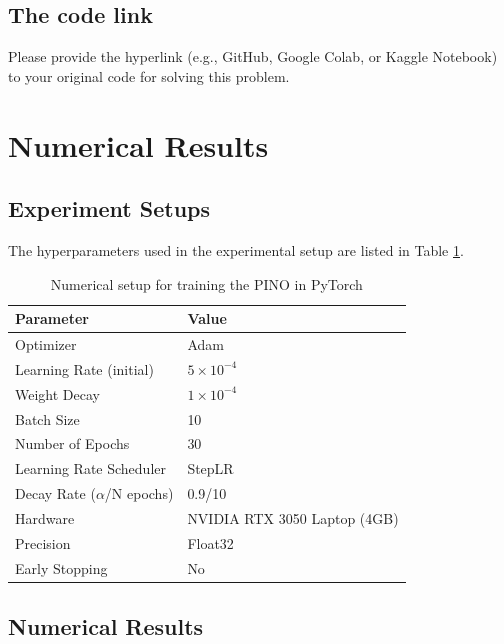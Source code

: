 \subsection{The code link}
{\color{blue}Please provide the hyperlink (e.g., GitHub, Google Colab, or Kaggle Notebook) to your original code for solving this problem.} 
%
\section{Numerical Results}
%
\subsection{Experiment Setups}
%

The hyperparameters used in the experimental setup are listed in Table \ref{tab:training_setup_D}. 


\begin{table}[H]
	\centering
	\caption{Numerical setup for training the PINO in PyTorch}
	\label{tab:training_setup_D}
	\begin{tabular}{ll}
		\hline
		\textbf{Parameter} & \textbf{Value} \\
		\hline
		Optimizer           & Adam \\
		Learning Rate (initial)       & $5 \times 10^{-4}$ \\
		Weight Decay       & $1 \times 10^{-4}$ \\
		Batch Size          & 10 \\
		Number of Epochs    & 30 \\
		Learning Rate Scheduler & StepLR \\
		Decay Rate ($\alpha$/N epochs) &  0.9/10\\
		Hardware            & NVIDIA RTX 3050 Laptop (4GB) \\
		Precision           & Float32 \\
		Early Stopping      & No \\
		\hline
	\end{tabular}
\end{table}

\subsection{Numerical Results}

